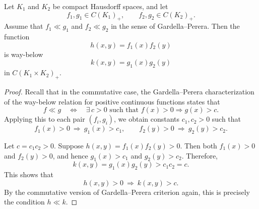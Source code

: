 \documentclass[10pt,a4paper]{amsart}
\begin{document}
\begin{proposition}
Let $K_1$ and $K_2$ be compact Hausdorff spaces, and let 
\[
f_1, g_1 \in C(K_1)_+, \qquad f_2, g_2 \in C(K_2)_+.
\]
Assume that $f_1 \ll g_1$ and $f_2 \ll g_2$ in the sense of Gardella--Perera.  
Then the function
\[
h(x,y) = f_1(x) f_2(y)
\]
is way-below
\[
k(x,y) = g_1(x) g_2(y)
\]
in $C(K_1 \times K_2)_+$.
\end{proposition}

\begin{proof}
Recall that in the commutative case, the Gardella--Perera characterization of the way-below relation for positive continuous functions states that
\[
f \ll g \quad \Longleftrightarrow \quad 
\exists\, c>0 \text{ such that } f(x)>0 \Rightarrow g(x)>c.
\]
Applying this to each pair $(f_i, g_i)$, we obtain constants $c_1, c_2 > 0$ such that
\[
f_1(x)>0 \ \Rightarrow\ g_1(x)>c_1, 
\qquad 
f_2(y)>0 \ \Rightarrow\ g_2(y)>c_2.
\]

Let $c = c_1 c_2 > 0$.  
Suppose $h(x,y) = f_1(x) f_2(y) > 0$.  
Then both $f_1(x)>0$ and $f_2(y)>0$, and hence $g_1(x)>c_1$ and $g_2(y)>c_2$.  
Therefore,
\[
k(x,y) = g_1(x) g_2(y) > c_1 c_2 = c.
\]
This shows that
\[
h(x,y)>0 \ \Rightarrow\ k(x,y)>c.
\]
By the commutative version of Gardella--Perera criterion again, this is precisely the condition $h \ll k$.
\end{proof}
\end{document}
